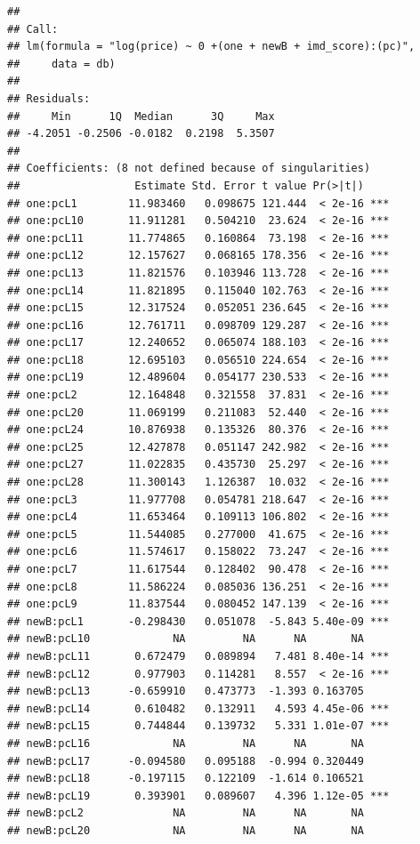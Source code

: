 \documentclass[
]{book}
\begin{document}
\begin{verbatim}
## 
## Call:
## lm(formula = "log(price) ~ 0 +(one + newB + imd_score):(pc)", 
##     data = db)
## 
## Residuals:
##     Min      1Q  Median      3Q     Max 
## -4.2051 -0.2506 -0.0182  0.2198  5.3507 
## 
## Coefficients: (8 not defined because of singularities)
##                  Estimate Std. Error t value Pr(>|t|)    
## one:pcL1        11.983460   0.098675 121.444  < 2e-16 ***
## one:pcL10       11.911281   0.504210  23.624  < 2e-16 ***
## one:pcL11       11.774865   0.160864  73.198  < 2e-16 ***
## one:pcL12       12.157627   0.068165 178.356  < 2e-16 ***
## one:pcL13       11.821576   0.103946 113.728  < 2e-16 ***
## one:pcL14       11.821895   0.115040 102.763  < 2e-16 ***
## one:pcL15       12.317524   0.052051 236.645  < 2e-16 ***
## one:pcL16       12.761711   0.098709 129.287  < 2e-16 ***
## one:pcL17       12.240652   0.065074 188.103  < 2e-16 ***
## one:pcL18       12.695103   0.056510 224.654  < 2e-16 ***
## one:pcL19       12.489604   0.054177 230.533  < 2e-16 ***
## one:pcL2        12.164848   0.321558  37.831  < 2e-16 ***
## one:pcL20       11.069199   0.211083  52.440  < 2e-16 ***
## one:pcL24       10.876938   0.135326  80.376  < 2e-16 ***
## one:pcL25       12.427878   0.051147 242.982  < 2e-16 ***
## one:pcL27       11.022835   0.435730  25.297  < 2e-16 ***
## one:pcL28       11.300143   1.126387  10.032  < 2e-16 ***
## one:pcL3        11.977708   0.054781 218.647  < 2e-16 ***
## one:pcL4        11.653464   0.109113 106.802  < 2e-16 ***
## one:pcL5        11.544085   0.277000  41.675  < 2e-16 ***
## one:pcL6        11.574617   0.158022  73.247  < 2e-16 ***
## one:pcL7        11.617544   0.128402  90.478  < 2e-16 ***
## one:pcL8        11.586224   0.085036 136.251  < 2e-16 ***
## one:pcL9        11.837544   0.080452 147.139  < 2e-16 ***
## newB:pcL1       -0.298430   0.051078  -5.843 5.40e-09 ***
## newB:pcL10             NA         NA      NA       NA    
## newB:pcL11       0.672479   0.089894   7.481 8.40e-14 ***
## newB:pcL12       0.977903   0.114281   8.557  < 2e-16 ***
## newB:pcL13      -0.659910   0.473773  -1.393 0.163705    
## newB:pcL14       0.610482   0.132911   4.593 4.45e-06 ***
## newB:pcL15       0.744844   0.139732   5.331 1.01e-07 ***
## newB:pcL16             NA         NA      NA       NA    
## newB:pcL17      -0.094580   0.095188  -0.994 0.320449    
## newB:pcL18      -0.197115   0.122109  -1.614 0.106521    
## newB:pcL19       0.393901   0.089607   4.396 1.12e-05 ***
## newB:pcL2              NA         NA      NA       NA    
## newB:pcL20             NA         NA      NA       NA    

\end{verbatim}
\end{document}
